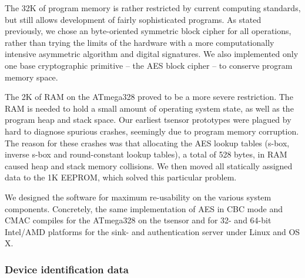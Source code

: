 The 32K of program memory is rather restricted by current computing standards, but still allows development of fairly sophisticated programs. As stated previously, we chose an byte-oriented symmetric block cipher for all operations, rather than trying the limits of the hardware with a more computationally intensive asymmetric algorithm and digital signatures. We also implemented only one base cryptographic primitive -- the AES block cipher -- to conserve program memory space.

The 2K of RAM on the ATmega328 proved to be a more severe restriction. The RAM is needed to hold a small amount of operating system state, as well as the program heap and stack space. Our earliest tsensor prototypes were plagued by hard to diagnose spurious crashes, seemingly due to program memory corruption. The reason for these crashes was that allocating the AES lookup tables (s-box, inverse s-box and round-constant lookup tables), a total of 528 bytes, in RAM caused heap and stack memory collisions. We then moved all statically assigned data to the 1K EEPROM, which solved this particular problem.

We designed the software for maximum re-usability on the various system components. Concretely, the same implementation of AES in CBC mode and CMAC compiles for the ATmega328 on the tsensor and for 32- and 64-bit Intel/AMD platforms for the sink- and authentication server under Linux and OS X.

\subsubsection{Device identification data}

